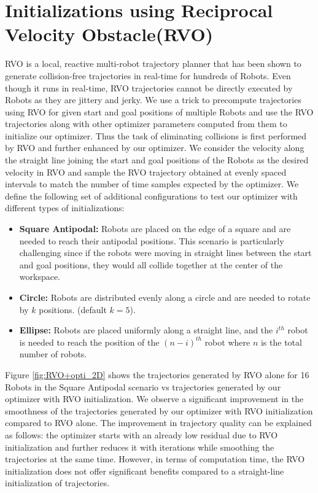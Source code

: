 \section{Initializations using Reciprocal Velocity Obstacle(RVO)\cite{RVO}}\label{sec:appendix-RVO}

RVO is a local, reactive multi-robot trajectory planner that has been shown to generate collision-free trajectories in real-time for hundreds of Robots\cite{RVO}. Even though it runs in real-time, RVO trajectories cannot be directly executed by Robots as they are jittery and jerky. We use a trick to precompute trajectories using RVO for given start and goal positions of multiple Robots and use the RVO trajectories along with other optimizer parameters computed from them to initialize our optimizer. Thus the task of eliminating collisions is first performed by RVO and further enhanced by our optimizer. We consider the velocity along the straight line joining the start and goal positions of the Robots as the desired velocity in RVO and sample the RVO trajectory obtained at evenly spaced intervals to match the number of time samples expected by the optimizer. We define the following set of additional configurations to test our optimizer with different types of initializations:

\begin{itemize}
  \item \textbf{Square Antipodal:}
  Robots are placed on the edge of a square and are needed to reach their antipodal positions. This scenario is particularly challenging since if the robots were moving in straight lines between the start and goal positions, they would all collide together at the center of the workspace.
  \item \textbf{Circle:}
  Robots are distributed evenly along a circle and are needed to rotate by $k$ positions. (default $k=5$).
  \item \textbf{Ellipse:}
  Robots are placed uniformly along a straight line, and the $i^{th}$ robot is needed to reach the position of the $(n-i)^{th}$ robot where $n$ is the total number of robots.
\end{itemize}

Figure \ref{fig:RVO+opti_2D} shows the trajectories generated by RVO alone for 16 Robots in the Square Antipodal scenario vs trajectories generated by our optimizer with RVO initialization. We observe a significant improvement in the smoothness of the trajectories generated by our optimizer with RVO initialization compared to RVO alone. The improvement in trajectory quality can be explained as follows: the optimizer starts with an already low residual due to RVO initialization and further reduces it with iterations while smoothing the trajectories at the same time. However, in terms of computation time, the RVO initialization does not offer significant benefits compared to a straight-line initialization of trajectories. 

